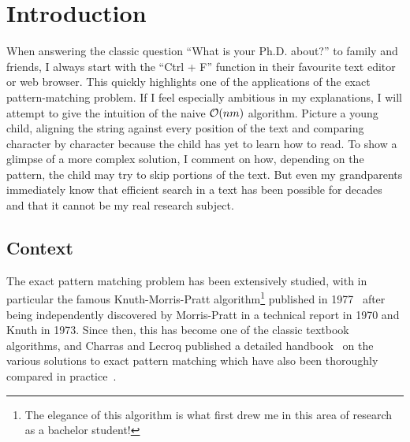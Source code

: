 \chapter*{Introduction}\label{chap:intro}\setcounter{page}{1}\frontmatter
{}

When answering the classic question ``What is your Ph.D. about?'' to family and friends, I always start with the ``Ctrl + F'' function in their favourite text editor or web browser. This quickly highlights one of the applications of the exact pattern-matching problem. If I feel especially ambitious in my explanations, I will attempt to give the intuition of the naive $\mathcal{O}(nm)$ algorithm. Picture a young child, aligning the string against every position of the text and comparing character by character because the child has yet to learn how to read. To show a glimpse of a more complex solution, I comment on how, depending on the pattern, the child may try to skip portions of the text. But even my grandparents immediately know that efficient search in a text has been possible for decades and that it cannot be my real research subject.

\section{Context}

The exact pattern matching problem has been extensively studied, with in particular the famous Knuth-Morris-Pratt algorithm\footnote{The elegance of this algorithm is what first drew me in this area of research as a bachelor student!} published in 1977~\cite{KMP} after being independently discovered by Morris-Pratt in a technical report in 1970 and Knuth in 1973. Since then, this has become one of the classic textbook algorithms, and Charras and Lecroq published a detailed handbook~\cite{Charras2004} on the various solutions to exact pattern matching which have also been thoroughly compared in practice~\cite{DBLP:journals/corr/abs-1012-2547, faro2013exact}.


